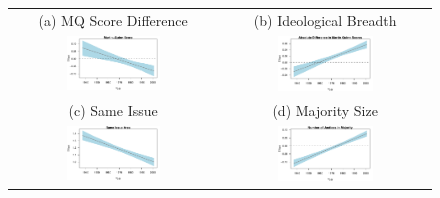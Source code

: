 \documentclass[headsepline=true, abstracton]{scrartcl}
\begin{document}
  \begin{figure}[H]
  \begin{tabular}{cc}
 (a) MQ Score Difference & (b) Ideological Breadth \\
\includegraphics[width = 0.475\textwidth, trim= 0.1cm 1cm 0.5cm .45cm,clip=true]{images/mq_coef_trend.pdf} & \includegraphics[width = 0.475\textwidth, trim= 0.1cm 1cm 0.5cm .45cm,clip=true]{images/absdiffmq_coef_trend.pdf} \\
 
  (c) Same Issue & (d) Majority Size \\
\includegraphics[width = 0.475\textwidth, trim= 0.1cm 1cm 0.5cm .45cm,clip=true]{images/sameissue_coef_trend.pdf} & \includegraphics[width = 0.475\textwidth, trim= 0.1cm 1cm 0.5cm .45cm,clip=true]{images/numberjusticespro_coef_trend.pdf} \\
 

\end{tabular}
\end{figure}
\end{document}
